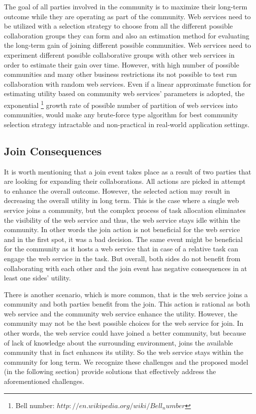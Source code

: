 \documentclass[10pt,journal,cspaper,compsoc]{IEEEtran}
\begin{document}
The goal of all parties involved in the community is to maximize their long-term outcome while they are operating as part of the community. Web services need to be utilized with a selection strategy to choose from all the different possible collaboration groups they can form and also an estimation method for evaluating the long-term gain of joining different possible communities. Web services need to experiment different possible collaborative groups with other web services in order to estimate their gain over time. However, with high number of possible communities and many other business restrictions its not possible to test run collaboration with random web services. Even if a linear approximate function for estimating utility based on community web services' parameters is adopted, the exponential \footnote{Bell number: $http://en.wikipedia.org/wiki/Bell_number$} growth rate of possible number of partition of web services into communities, would make any brute-force type algorithm for best community selection strategy intractable and non-practical in real-world application settings.

\subsection{Join Consequences}\label{s:jc}
It is worth mentioning that a join event takes place as a result of two parties that are looking for expanding their collaborations. All actions are picked in attempt to enhance the overall outcome. However, the selected action may result in decreasing the overall utility in long term. This is the case where a single web service joins a community, but the complex process of task allocation eliminates the visibility of the web service and thus, the web service stays idle within the community. In other words the join action is not beneficial for the web service and in the first spot, it was a bad decision.  The same event might be beneficial for the community as it hosts a web service that in case of a relative task can engage the web service in the task. But overall, both sides do not benefit from collaborating with each other and the join event has negative consequences in at least one sides' utility. 

There is another scenario, which is more common, that is the web service joins a community and both parties benefit from the join. This action is rational as both web service and the community web service enhance the utility. However, the community may not be the best possible choices for the web service for join. In other words, the web service could have joined a better community, but because of lack of knowledge about the surrounding environment, joins the available community that in fact enhances its utility. So the web service stays within the community for long term. We recognize these challenges and the proposed model (in the following section) provide solutions that effectively address the aforementioned challenges.  
\end{document}
